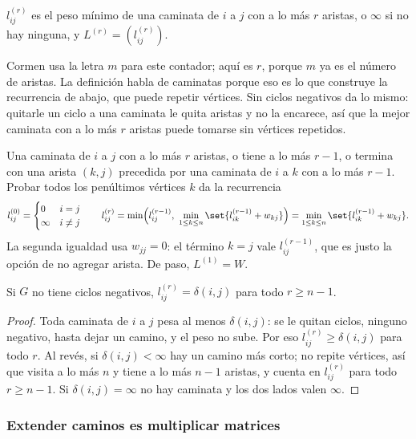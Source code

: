\documentclass[11pt,letterpaper]{article}
\begin{document}
\begin{definicion}
  \label{def:aristas-pares}
  $l^{(r)}_{ij}$ es el peso mínimo de una caminata de $i$ a $j$ con a
  lo más $r$ aristas, o $\infty$ si no hay ninguna, y
  $L^{(r)} = (l^{(r)}_{ij})$.
\end{definicion}

Cormen usa la letra $m$ para este contador; aquí es $r$, porque $m$ ya
es el número de aristas. La definición habla de caminatas porque eso
es lo que construye la recurrencia de abajo, que puede repetir
vértices. Sin ciclos negativos da lo mismo: quitarle un ciclo a una
caminata le quita aristas y no la encarece, así que la mejor caminata
con a lo más $r$ aristas puede tomarse sin vértices repetidos.

Una caminata de $i$ a $j$ con a lo más $r$ aristas, o tiene a lo más
$r - 1$, o termina con una arista $(k, j)$ precedida por una caminata
de $i$ a $k$ con a lo más $r - 1$. Probar todos los penúltimos
vértices $k$ da la recurrencia
\[
  l^{(0)}_{ij} = \begin{cases} 0 & i = j \\ \infty & i \neq j
  \end{cases}
  \qquad
  l^{(r)}_{ij}
  = \min\Bigl( l^{(r-1)}_{ij},\
      \min_{1 \le k \le n} \set{l^{(r-1)}_{ik} + w_{kj}} \Bigr)
  = \min_{1 \le k \le n} \set{l^{(r-1)}_{ik} + w_{kj}} .
\]
La segunda igualdad usa $w_{jj} = 0$: el término $k = j$ vale
$l^{(r-1)}_{ij}$, que es justo la opción de no agregar arista. De
paso, $L^{(1)} = W$.

\begin{proposicion}
  \label{prop:parar-pares}
  Si $G$ no tiene ciclos negativos, $l^{(r)}_{ij} = \delta(i, j)$ para
  todo $r \ge n - 1$.
\end{proposicion}

\begin{proof}
  Toda caminata de $i$ a $j$ pesa al menos $\delta(i, j)$: se le
  quitan ciclos, ninguno negativo, hasta dejar un camino, y el peso no
  sube. Por eso $l^{(r)}_{ij} \ge \delta(i, j)$ para todo $r$. Al
  revés, si $\delta(i, j) < \infty$ hay un camino más corto; no repite
  vértices, así que visita a lo más $n$ y tiene a lo más $n - 1$
  aristas, y cuenta en $l^{(r)}_{ij}$ para todo $r \ge n - 1$. Si
  $\delta(i, j) = \infty$ no hay caminata y los dos lados valen
  $\infty$.
\end{proof}

\subsubsection*{Extender caminos es multiplicar matrices}
\end{document}

